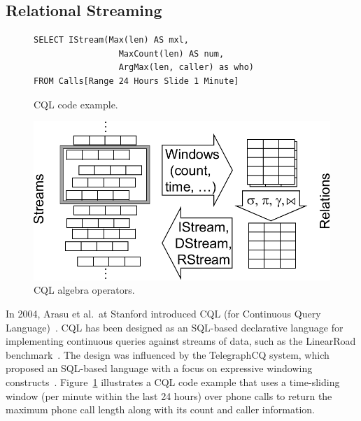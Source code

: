 \subsection{Relational Streaming}\label{sec:sql} %

\begin{figure}[!h]
\begin{lstlisting}
SELECT IStream(Max(len) AS mxl,
                 MaxCount(len) AS num,
                 ArgMax(len, caller) as who)
FROM Calls[Range 24 Hours Slide 1 Minute]
\end{lstlisting}
\vspace*{-4mm}
\caption{\label{fig:cql}CQL code example.}
\end{figure}

\begin{figure}
\centerline{\includegraphics[scale=0.5]{cqlops.pdf}}
\vspace*{-4mm}
\caption{\label{fig:cqlops}CQL algebra operators.}
\end{figure}

In 2004, Arasu et al.\ at Stanford introduced CQL (for Continuous
Query Language)~\cite{arasu_widom_2004}. CQL has been designed as an
SQL-based declarative language for implementing continuous queries
against streams of data, such as the LinearRoad
benchmark~\cite{arasu_et_al_2004}. The design was influenced by the
TelegraphCQ system, which proposed an SQL-based language with a
focus on expressive windowing
constructs~\cite{chandrasekaran_et_al_2003}.
Figure~\ref{fig:cql} illustrates a CQL code example that
uses a time-sliding window (per minute within the last 24 hours) over
phone calls to return the maximum phone call length along with its
count and caller information.

